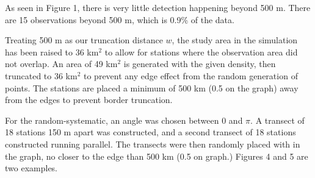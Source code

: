 \documentclass[12pt]{article}
\begin{document}
As seen in Figure 1, there is very little detection happening beyond 500 m. There are 15 observations beyond 500 m, which is 0.9\% of the data. 

Treating 500 m as our truncation distance $w$, the study area in the simulation has been raised to 36 km$^2$ to allow for stations where the observation area did not overlap. An area of 49 km$^2$ is generated with the given density, then truncated to 36 km$^2$ to prevent any edge effect from the random generation of points. The stations are placed a minimum of 500 km (0.5 on the graph) away from the edges to prevent border truncation. 

For the random-systematic, an angle was chosen between $0$ and $\pi$. A transect of 18 stations 150 m apart was constructed, and a second transect of 18 stations constructed running parallel. The transects were then randomly placed with in the graph, no closer to the edge than 500 km (0.5 on graph.) Figures 4 and 5 are two examples.
\end{document}
